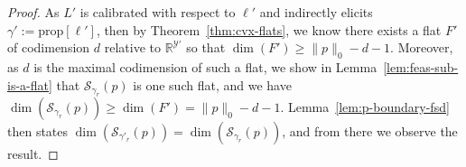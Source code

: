 \documentclass{article}
\newcommand{\reals}{\mathbb{R}}
\newcommand{\simplex}{\Delta_\Y}
\newcommand{\relint}[1]{\mathrm{relint}(#1)}
\newcommand{\prop}[1]{\mathrm{prop}[#1]}
\newcommand{\R}{\mathcal{R}}
\renewcommand{\S}{\mathcal{S}}
\newcommand{\Y}{\mathcal{Y}}
\begin{document}
\begin{proof}
	As $L'$ is calibrated with respect to $\ell'$ and indirectly elicits $\gamma' := \prop{\ell'}$, then by Theorem~\ref{thm:cvx-flats}, we know there exists a flat $F'$ of codimension $d$ relative to $\reals^{\Y'}$ so that $\dim(F') \geq \|p\|_0 - d - 1$.
	Moreover, as $d$ is the maximal codimension of such a flat, we show in Lemma~\ref{lem:feas-sub-is-a-flat} that $\S_{\gamma_r}(p)$ is one such flat, and we have $\dim(\S_{\gamma_r}(p)) \geq \dim(F') = \|p\|_0 - d- 1$.
	Lemma~\ref{lem:p-boundary-fsd} then states $\dim(\S_{\gamma'_r}(p)) = \dim(\S_{\gamma_r}(p))$, and from there we observe the result.
%
%	
%	
%
\end{proof}
\end{document}
